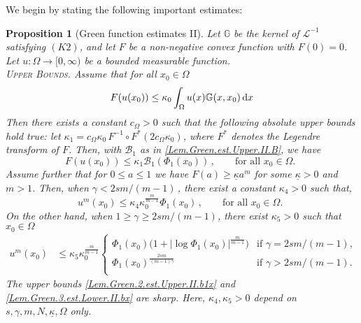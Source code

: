 \documentclass[11pt]{article}
\newtheorem{prop}[thm]{Proposition}
\numberwithin{equation}{section}
\newcommand{\dx}{\,{\rm d}x}
\newcommand{\AI}{\mathcal{L}^{-1}}
\newcommand{\n}{F}
\newcommand{\nl}{{F^*}}
\newcommand{\kb}{\underline{\kappa}}
\newcommand{\K}{{\mathbb G}}
\newcommand{\B}{\mathcal{B}}
\begin{document}
We begin  by stating the following important estimates:\vspace{-3mm}
\begin{prop}[Green function estimates II]\label{Prop.Green.2aaa}
Let $\K$ be the kernel of $\AI$ satisfying $(K2)$, and let $F$ be a non-negative convex function with $\n(0)=0$. Let $u:\Omega \to [0,\infty)$ be a bounded measurable function.\\
\noindent\textsc{Upper Bounds.} Assume that for all $x_0\in\Omega$\vspace{-2mm}
\begin{equation}\label{Lem.Green.2.hyp.aaa}
\n(u(x_0))\le \kappa_0\int_{\Omega} u(x)\K(x,x_0)\dx\vspace{-2mm}
\end{equation}
Then there exists a constant $c_{\Omega}>0$ such that  the following absolute upper bounds hold true:  let  $\kappa_1=c_{\Omega}\kappa_0\,\n^{-1}\circ\nl(2c_{\Omega}\kappa_0)$, where $F^*$ denotes the Legendre transform of $F$. Then, with $\B_1$ as in \eqref{Lem.Green.est.Upper.II.B}, we have\vspace{-1mm}
\begin{equation}\label{Lem.Green.2.est.Upper.aaa}
\n(u(x_0))\le \kappa_1\B_1(\Phi_1(x_0))\,,\qquad\mbox{for all $x_0\in \Omega$. }
\end{equation}
Assume further that for $0\leq a\le 1 $ we have $F(a)\ge \kb a^m$ for some $\kb>0$ and $m>1$. Then, when $\gamma<2sm/(m-1)$\,, there exist a constant $\kappa_4>0$ such that,\vspace{-1mm}
\begin{equation}\label{Lem.Green.2.est.Upper.II.b1x}
u^{m}(x_0) \le \kappa_4\kappa_0^{\frac{m}{m-1}}\Phi_1(x_0) \,,\qquad\mbox{for all $x_0\in \Omega$. }
\end{equation}
\noindent On the other hand, when $1\ge \gamma\geq  2s m/(m-1)$, there exist $\kappa_5>0$ such that  $ x_0\in \Omega$
\begin{equation}\label{Lem.Green.3.est.Lower.II.bx}
\begin{split}
 u^{m}(x_0)  &\le
\kappa_{5} \kappa_0^{\frac{m}{m-1}}
\left\{
\begin{array}{ll}
\Phi_1(x_0)\big(1+|\log \Phi_1(x_0)|^{\frac{m}{m-1}}\big)&\text{if $\gamma= 2s m/(m-1)$},\\
\Phi_1(x_0)^{\frac{2sm}{(m-1)\gamma}}&\text{if $\gamma> 2s m/(m-1)$}.\\
\end{array}
\right.
\end{split}
\end{equation}
The upper bounds \eqref{Lem.Green.2.est.Upper.II.b1x} and \eqref{Lem.Green.3.est.Lower.II.bx} are sharp. Here, $\kappa_4,\kappa_5>0$ depend on $s,\gamma, m, N, \kb, \Omega$ only.



\end{prop}
\end{document}
